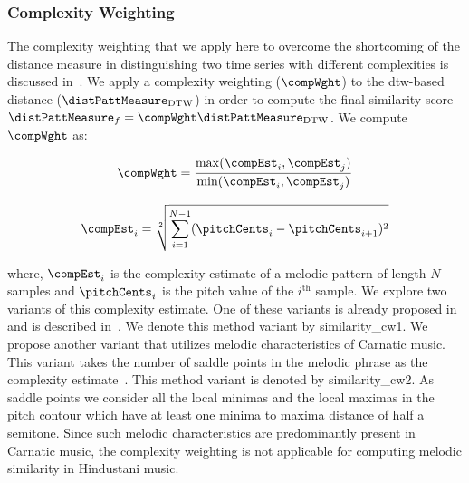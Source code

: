 \subsubsection{Complexity Weighting}
\label{sec:patterns_improving_similarity_complexity_invariance_weighting}

The complexity weighting that we apply here to overcome the shortcoming of the distance measure in distinguishing two time series with different complexities is discussed in~\cite{batista2011complexity}. We apply a complexity weighting ($\compWght$) to the \gls{dtw}-based distance ($\distPattMeasure_\mathrm{DTW}$) in order to compute the final similarity score $\distPattMeasure_{f}=\compWght \distPattMeasure_\mathrm{DTW}$. We compute $\compWght$ as:


\begin{equation}
\begin{gathered}
\compWght = \frac{\max(\compEst_i,\compEst_j)}{\min(\compEst_i, \compEst_j)} \\
\end{gathered}
\label{eq:complexity_weighing}
\end{equation}

\begin{equation}
\begin{gathered}
\compEst_i = \sqrt[2]{\sum_{i=1}^{N-1} (\pitchCents_{i}-\pitchCents_{i+1})^2}\\
\end{gathered}
\label{eq:complexity_estimate_batista}
\end{equation}

\noindent where, $\compEst_i$ is the complexity estimate of a melodic pattern of length $N$ samples and $\pitchCents_i$ is the pitch value of the $i^{\mathrm{th}}$ sample. We explore two variants of this complexity estimate. One of these variants is already proposed in~\cite{batista2011complexity} and is described in~. We denote this method variant by \acrshort{similarity_cw1}. We propose another variant that utilizes melodic characteristics of Carnatic music. This variant takes the number of saddle points in the melodic phrase as the complexity estimate~\citep{Ishwar2013}. This method variant is denoted by \acrshort{similarity_cw2}. As saddle points we consider all the local minimas and the local maximas in the pitch contour which have at least one minima to maxima distance of half a semitone. Since such melodic characteristics are predominantly present in Carnatic music, the complexity weighting is not applicable for computing melodic similarity in Hindustani music.


